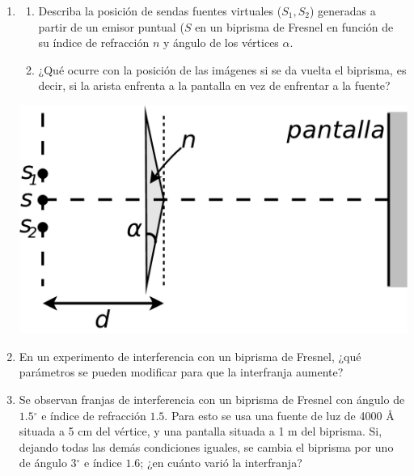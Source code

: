 \documentclass[11pt,spanish,a4paper]{article}
\begin{document}
\begin{enumerate}
\item
\begin{minipage}[t]{0.65\textwidth}
\begin{enumerate}
	\item Describa la posición de sendas fuentes virtuales (\(S_1, S_2\)) generadas a partir de un emisor puntual (\(S\) en un biprisma de Fresnel en función de su índice de refracción \(n\) y ángulo de los vértices \(\alpha\).
	\item ¿Qué ocurre con la posición de las imágenes si se da vuelta el biprisma, es decir, si la arista enfrenta a la pantalla en vez de enfrentar a la fuente?
\end{enumerate}
\end{minipage}
\begin{minipage}[c][1em][t]{0.3\textwidth}
	\includegraphics[width=\textwidth]{ej5-11}
\end{minipage}


\item En un experimento de interferencia con un biprisma de Fresnel, ¿qué
parámetros se pueden modificar para que la interfranja aumente?


\item
Se observan franjas de interferencia con un biprisma de Fresnel con
ángulo de $1.5{}^{\circ}$ e índice de refracción $1.5$. Para esto
se usa una fuente de luz de 4000 Å situada a 5 cm del vértice, y una
pantalla situada a 1 m del biprisma. Si, dejando todas las demás condiciones
iguales, se cambia el biprisma por uno de ángulo 3$^{\circ}$ e índice
$1.6$; ¿en cuánto varió la interfranja?






\end{enumerate}
\end{document}
